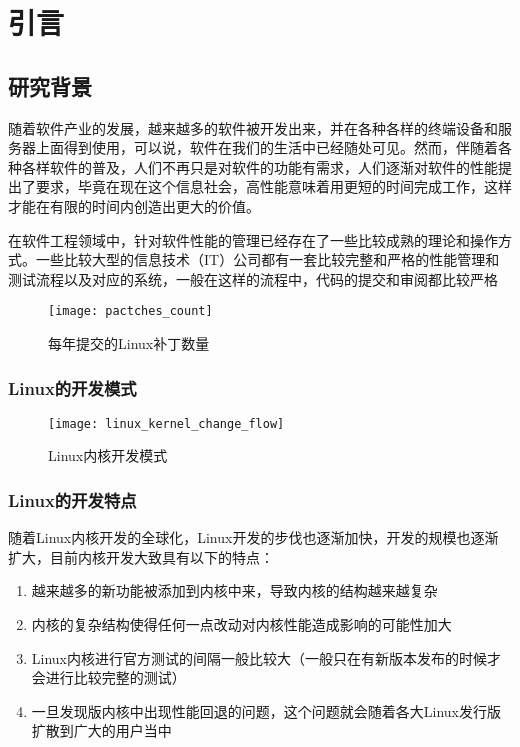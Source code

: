 
\chapter{引言}


\section{研究背景}

随着软件产业的发展，越来越多的软件被开发出来，并在各种各样的终端设备和服务器上面得到使用，可以说，软件在我们的生活中已经随处可见。然而，伴随着各种各样软件的普及，人们不再只是对软件的功能有需求，人们逐渐对软件的性能提出了要求，毕竟在现在这个信息社会，高性能意味着用更短的时间完成工作，这样才能在有限的时间内创造出更大的价值。

在软件工程领域中，针对软件性能的管理已经存在了一些比较成熟的理论和操作方式。一些比较大型的信息技术（IT）公司都有一套比较完整和严格的性能管理和测试流程以及对应的系统，一般在这样的流程中，代码的提交和审阅都比较严格



\begin{figure}[H]
\centering
\texttt{[image: pactches\_count]}
\caption{每年提交的Linux补丁数量}
\label{fig:pactches_count}
\end{figure}


\subsection{Linux的开发模式}



\begin{figure}[H]
\centering
\texttt{[image: linux\_kernel\_change\_flow]}
\caption{Linux内核开发模式}
\label{fig:linux_kernel_change_flow}
\end{figure}

\subsection{Linux的开发特点}

随着Linux内核开发的全球化，Linux开发的步伐也逐渐加快，开发的规模也逐渐扩大，目前内核开发大致具有以下的特点：

\begin{enumerate}
\item 越来越多的新功能被添加到内核中来，导致内核的结构越来越复杂
\item 内核的复杂结构使得任何一点改动对内核性能造成影响的可能性加大
\item Linux内核进行官方测试的间隔一般比较大（一般只在有新版本发布的时候才会进行比较完整的测试）
\item 一旦发现版内核中出现性能回退的问题，这个问题就会随着各大Linux发行版扩散到广大的用户当中
\end{enumerate}

